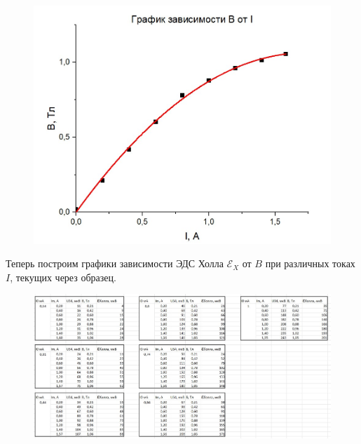 \documentclass[a4paper,12pt]{article}
\begin{document}
\begin{figure}[H]
	\begin{center}	\includegraphics[width=.9\textwidth]{graph1.jpg}
	\end{center}
\end{figure}

Теперь построим графики зависимости ЭДС Холла $\mathcal{E}_X$ от $B$ при различных токах $I$, текущих через образец.

\begin{figure}[H]
	\begin{center}	\includegraphics[width=1\textwidth]{tabliza2.jpg}
	\end{center}
\end{figure}
\end{document}
